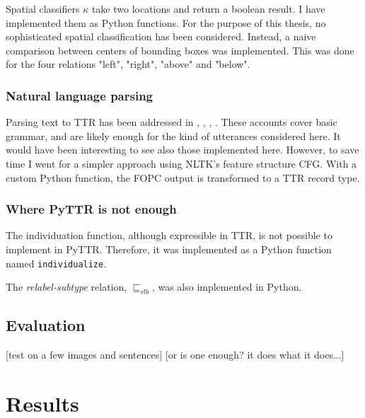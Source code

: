\documentclass[11pt, a4paper]{article}
\begin{document}
Spatial classifiers $\kappa$ take two locations and return a boolean result.
I have implemented them as Python functions.
For the purpose of this thesis, no sophisticated spatial classification has been considered.
Instead, a naive comparison between centers of bounding boxes was implemented.
This was done for the four relations "left", "right", "above" and "below".



\subsubsection{Natural language parsing}

Parsing text to TTR has been addressed in \cite{CooperRecordsRecordTypes2005}, \cite{RobinCooperAustiniantruthattitudes2005}, \cite{CooperTypetheorysemantics2012}, \cite{CooperTypetheorylanguage2016}.
These accounts cover basic grammar, and are likely enough for the kind of utterances considered here.
It would have been interesting to see also those implemented here.
However, to save time I went for a simpler approach using NLTK's feature structure CFG.
With a custom Python function, the FOPC output is transformed to a TTR record type.



\subsubsection{Where PyTTR is not enough}

The individuation function, although expressible in TTR, is not possible to implement in PyTTR.
Therefore, it was implemented as a Python function named {\tt individualize}.

The \textit{relabel-subtype} relation, $\sqsubseteq_{rlb}$, was also implemented in Python.



\subsection{Evaluation}

[test on a few images and sentences] [or is one enough? it does what it does...]



\section{Results}
\label{sec:results}
\end{document}
